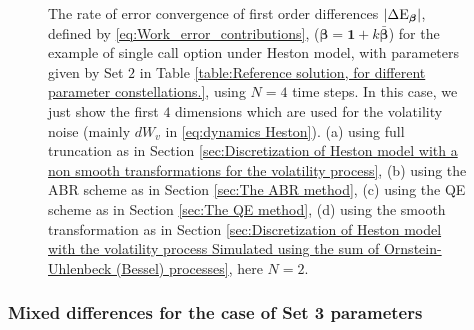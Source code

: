 \begin{figure}[htb]
	\caption{The rate of error convergence of first order differences $\left\lvert\Delta \text{E}_{\boldsymbol{\beta}}\right\rvert$, defined by \eqref{eq:Work_error_contributions}, ($\boldsymbol{\beta}=\mathbf{1}+k \bar{\boldsymbol{\beta}}$) for the example of single call option under Heston model, with parameters given by Set $2$ in Table \ref{table:Reference solution, for different parameter constellations.}, using $N=4$ time steps. In this case, we just show  the first  $4$ dimensions which are used for the volatility noise (mainly $dW_v$ in \eqref{eq:dynamics Heston}). (a) using full truncation as in Section \ref{sec:Discretization of Heston model with a non smooth transformations for the volatility process}, (b) using the ABR scheme as in Section \ref{sec:The ABR method}, (c) using the QE scheme as in Section \ref{sec:The QE method}, (d) using the smooth transformation as in Section \ref{sec:Discretization of Heston model with the volatility process Simulated using the sum of  Ornstein-Uhlenbeck (Bessel) processes}, here $N=2$.}
	\label{fig:first_diff_Heston_call_N_4_set3}	
\end{figure}
\FloatBarrier
\subsubsection*{Mixed differences for the case of Set 3 parameters}

